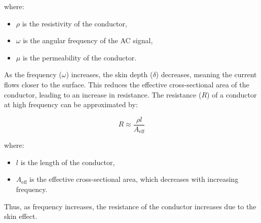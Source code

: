 where:
\begin{itemize}
    \item \(\rho\) is the resistivity of the conductor,
    \item \(\omega\) is the angular frequency of the AC signal,
    \item \(\mu\) is the permeability of the conductor.
\end{itemize}

As the frequency (\(\omega\)) increases, the skin depth (\(\delta\)) decreases, meaning the current flows closer to the surface. This reduces the effective cross-sectional area of the conductor, leading to an increase in resistance. The resistance (\(R\)) of a conductor at high frequency can be approximated by:

\[
R \approx \frac{\rho l}{A_{\text{eff}}}
\]

where:
\begin{itemize}
    \item \(l\) is the length of the conductor,
    \item \(A_{\text{eff}}\) is the effective cross-sectional area, which decreases with increasing frequency.
\end{itemize}

Thus, as frequency increases, the resistance of the conductor increases due to the skin effect.


